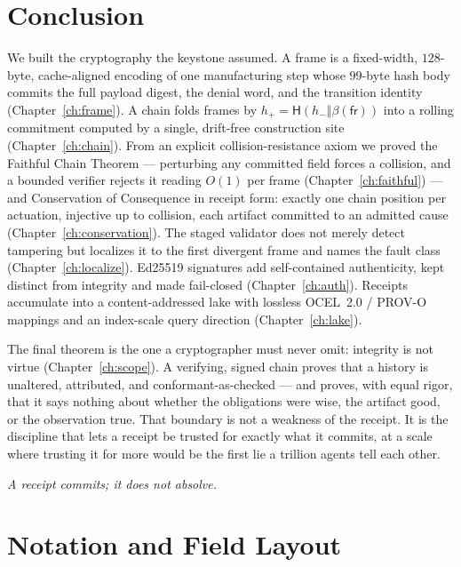 \documentclass[11pt,oneside]{book}
\theoremstyle{definition}
\theoremstyle{plain}
\theoremstyle{remark}
\newcommand{\chainH}{\mathsf{H}}               %
\newcommand{\fr}{\mathsf{fr}}                   %
\newcommand{\body}{\beta}                       %
\newcommand{\concat}{\mathbin{\Vert}}           %
\begin{document}
\chapter{Conclusion}

We built the cryptography the keystone assumed. A frame is a fixed-width, $128$-byte,
cache-aligned encoding of one manufacturing step whose $99$-byte hash body commits the full
payload digest, the denial word, and the transition identity (Chapter~\ref{ch:frame}). A chain
folds frames by $h_{+}=\chainH(h_{-}\concat\body(\fr))$ into a rolling commitment computed by a
single, drift-free construction site (Chapter~\ref{ch:chain}). From an explicit
collision-resistance axiom we proved the Faithful Chain Theorem --- perturbing any committed
field forces a collision, and a bounded verifier rejects it reading $O(1)$ per frame
(Chapter~\ref{ch:faithful}) --- and Conservation of Consequence in receipt form: exactly one
chain position per actuation, injective up to collision, each artifact committed to an admitted
cause (Chapter~\ref{ch:conservation}). The staged validator does not merely detect tampering
but localizes it to the first divergent frame and names the fault class
(Chapter~\ref{ch:localize}). Ed25519 signatures add self-contained authenticity, kept
distinct from integrity and made fail-closed (Chapter~\ref{ch:auth}). Receipts accumulate into
a content-addressed lake with lossless OCEL~2.0 / PROV-O mappings and an index-scale query
direction (Chapter~\ref{ch:lake}).

The final theorem is the one a cryptographer must never omit: integrity is not virtue
(Chapter~\ref{ch:scope}). A verifying, signed chain proves that a history is unaltered,
attributed, and conformant-as-checked --- and proves, with equal rigor, that it says nothing
about whether the obligations were wise, the artifact good, or the observation true. That
boundary is not a weakness of the receipt. It is the discipline that lets a receipt be trusted
for exactly what it commits, at a scale where trusting it for more would be the first lie a
trillion agents tell each other.

\begin{center}\itshape A receipt commits; it does not absolve.\end{center}

\appendix
\chapter{Notation and Field Layout}
\end{document}
